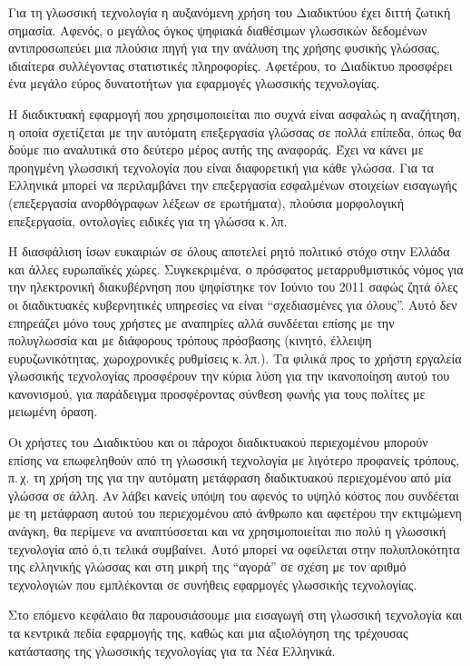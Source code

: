 \documentclass[]{../../metanetpaper}
\begin{document}
\begin{multicols}{2}
Για τη γλωσσική τεχνολογία η αυξανόμενη χρήση του Διαδικτύου έχει διττή ζωτική σημασία. Αφενός, ο μεγάλος όγκος  ψηφιακά διαθέσιμων γλωσσικών δεδομένων αντιπροσωπεύει μια πλούσια πηγή για την ανάλυση της χρήσης φυσικής γλώσσας, ιδιαίτερα συλλέγοντας στατιστικές πληροφορίες. Αφετέρου, το Διαδίκτυο προσφέρει ένα μεγάλο εύρος δυνατοτήτων για εφαρμογές γλωσσικής τεχνολογίας.

Η διαδικτυακή εφαρμογή που χρησιμοποιείται πιο συχνά είναι ασφαλώς η αναζήτηση, η οποία σχετίζεται με την αυτόματη επεξεργασία γλώσσας σε πολλά επίπεδα, όπως θα δούμε πιο αναλυτικά στο δεύτερο μέρος αυτής της αναφοράς. Έχει να κάνει με προηγμένη γλωσσική τεχνολογία που είναι διαφορετική για κάθε γλώσσα. Για τα Ελληνικά μπορεί να περιλαμβάνει την επεξεργασία εσφαλμένων στοιχείων εισαγωγής (επεξεργασία ανορθόγραφων λέξεων σε ερωτήματα), πλούσια μορφολογική επεξεργασία, οντολογίες ειδικές για τη γλώσσα κ.\,λπ.

Η διασφάλιση ίσων ευκαιριών σε όλους αποτελεί ρητό πολιτικό στόχο στην Ελλάδα και άλλες ευρωπαϊκές χώρες. Συγκεκριμένα, ο πρόσφατος μεταρρυθμιστικός νόμος για την ηλεκτρονική διακυβέρνηση που ψηφίστηκε τον Ιούνιο του 2011 σαφώς ζητά όλες οι διαδικτυακές κυβερνητικές υπηρεσίες να είναι “σχεδιασμένες για όλους”. Αυτό δεν επηρεάζει μόνο τους χρήστες με αναπηρίες αλλά συνδέεται επίσης με την πολυγλωσσία και με διάφορους τρόπους πρόσβασης (κινητό, έλλειψη ευρυζωνικότητας, χωροχρονικές ρυθμίσεις κ.\,λπ.). Τα φιλικά προς το χρήστη εργαλεία γλωσσικής τεχνολογίας προσφέρουν την κύρια λύση για την ικανοποίηση αυτού του κανονισμού, για παράδειγμα προσφέροντας σύνθεση φωνής για τους πολίτες με μειωμένη όραση.

Οι χρήστες του Διαδικτύου και οι πάροχοι διαδικτυακού περιεχομένου μπορούν επίσης να επωφεληθούν από τη γλωσσική τεχνολογία με λιγότερο προφανείς τρόπους, π.\,χ. τη χρήση της για την αυτόματη μετάφραση διαδικτυακού περιεχομένου από μία γλώσσα σε άλλη. Αν λάβει κανείς υπόψη του αφενός το υψηλό κόστος που συνδέεται με τη μετάφραση αυτού του περιεχομένου από  άνθρωπο και αφετέρου την εκτιμώμενη ανάγκη, θα περίμενε να αναπτύσσεται και να χρησιμοποιείται πιο πολύ η γλωσσική τεχνολογία από ό,τι τελικά συμβαίνει. Αυτό μπορεί να οφείλεται στην πολυπλοκότητα της ελληνικής γλώσσας και στη μικρή της “αγορά” σε σχέση με τον αριθμό τεχνολογιών που εμπλέκονται σε συνήθεις εφαρμογές γλωσσικής τεχνολογίας.

Στο επόμενο κεφάλαιο θα παρουσιάσουμε μια εισαγωγή στη γλωσσική τεχνολογία και τα κεντρικά πεδία εφαρμογής της, καθώς και μια αξιολόγηση της τρέχουσας κατάστασης της γλωσσικής τεχνολογίας για τα Νέα Ελληνικά.
\end{multicols}
\end{document}
